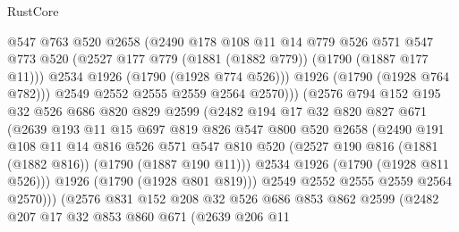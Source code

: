 \begin{lexlean}{RustCore}
\begin{coremodule}
                      @547
                      @763
                      @520
                      @2658
                      (@2490
                        @178
                        @108
                        @11
                        @14
                        @779
                        @526
                        @571
                        @547
                        @773
                        @520
                        (@2527 @177 @779 (@1881 (@1882 @779)) (@1790 (@1887 @177 @11)))
                        @2534
                        @1926
                        (@1790 (@1928 @774 @526)))
                      @1926
                      (@1790 (@1928 @764 @782)))
                    @2549
                    @2552
                    @2555
                    @2559
                    @2564
                    @2570)))
              (@2576
                @794
                @152
                @195
                @32
                @526
                @686
                @820
                @829
                @2599
                (@2482
                  @194
                  @17
                  @32
                  @820
                  @827
                  @671
                  (@2639
                    @193
                    @11
                    @15
                    @697
                    @819
                    @826
                    @547
                    @800
                    @520
                    @2658
                    (@2490
                      @191
                      @108
                      @11
                      @14
                      @816
                      @526
                      @571
                      @547
                      @810
                      @520
                      (@2527 @190 @816 (@1881 (@1882 @816)) (@1790 (@1887 @190 @11)))
                      @2534
                      @1926
                      (@1790 (@1928 @811 @526)))
                    @1926
                    (@1790 (@1928 @801 @819)))
                  @2549
                  @2552
                  @2555
                  @2559
                  @2564
                  @2570)))
            (@2576
              @831
              @152
              @208
              @32
              @526
              @686
              @853
              @862
              @2599
              (@2482
                @207
                @17
                @32
                @853
                @860
                @671
                (@2639
                  @206
                  @11

\end{coremodule}
\end{lexlean}

